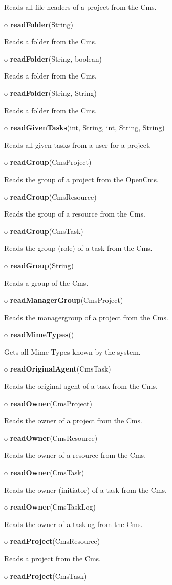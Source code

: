 \begin{description}
Reads all file headers of a project from the Cms.
\item o {\bf readFolder}(String)

Reads a folder from the Cms.
\item o {\bf readFolder}(String, boolean)

Reads a folder from the Cms.
\item o {\bf readFolder}(String, String)

Reads a folder from the Cms.
\item o {\bf readGivenTasks}(int, String, int, String, String)

Reads all given tasks from a user for a project.
\item o {\bf readGroup}(CmsProject)

Reads the group of a project from the OpenCms.
\item o {\bf readGroup}(CmsResource)

Reads the group of a resource from the Cms.
\item o {\bf readGroup}(CmsTask)

Reads the group (role) of a task from the Cms.
\item o {\bf readGroup}(String)

Reads a group of the Cms.
\item o {\bf readManagerGroup}(CmsProject)

Reads the managergroup of a project from the Cms.
\item o {\bf readMimeTypes}()

Gets all Mime-Types known by the system.
\item o {\bf readOriginalAgent}(CmsTask)

Reads the original agent of a task from the Cms.
\item o {\bf readOwner}(CmsProject)

Reads the owner of a project from the Cms.
\item o {\bf readOwner}(CmsResource)

Reads the owner of a resource from the Cms.
\item o {\bf readOwner}(CmsTask)

Reads the owner (initiator) of a task from the Cms.
\item o {\bf readOwner}(CmsTaskLog)

Reads the owner of a tasklog from the Cms.
\item o {\bf readProject}(CmsResource)

Reads a project from the Cms.
\item o {\bf readProject}(CmsTask)


\end{description}
